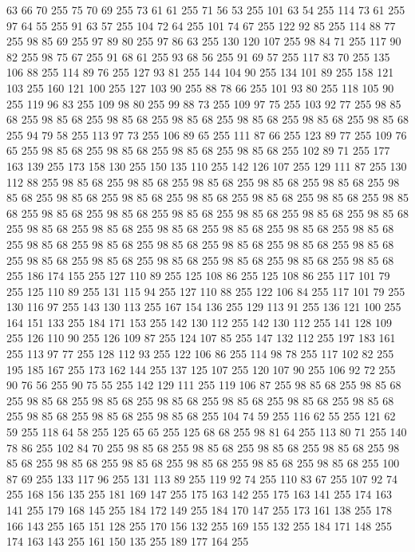 63 66 70 255 75 70 69 255 73 61 61 255 71 56 53 255 101 63 54 255 114 73 61 255 97 64 55 255 91 63 57 255 104 72 64 255 101 74 67 255 122 92 85 255 114 88 77 255 98 85 69 255 97 89 80 255 97 86 63 255 130 120 107 255 98 84 71 255 117 90 82 255 98 75 67 255 91 68 61 255 93 68 56 255 91 69 57 255 117 83 70 255 135 106 88 255 114 89 76 255 127 93 81 255 144 104 90 255 134 101 89 255 158 121 103 255 160 121 100 255 127 103 90 255 88 78 66 255 101 93 80 255 118 105 90 255 119 96 83 255 109 98 80 255 99 88 73 255 109 97 75 255 103 92 77 255 98 85 68 255 98 85 68 255 98 85 68 255 98 85 68 255 98 85 68 255 98 85 68 255 98 85 68 255 94 79 58 255 113 97 73 255 106 89 65 255 111 87 66 255 123 89 77 255 109 76 65 255 98 85 68 255 98 85 68 255 98 85 68 255 98 85 68 255 102 89 71 255 177 163 139 255 173 158 130 255 150 135 110 255 142 126 107 255 129 111 87 255 130 112 88 255 98 85 68 255
98 85 68 255 98 85 68 255 98 85 68 255 98 85 68 255 98 85 68 255 98 85 68 255 98 85 68 255 98 85 68 255 98 85 68 255 98 85 68 255 98 85 68 255 98 85 68 255 98 85 68 255 98 85 68 255 98 85 68 255 98 85 68 255 98 85 68 255 98 85 68 255 98 85 68 255 98 85 68 255 98 85 68 255 98 85 68 255 98 85 68 255 98 85 68 255 98 85 68 255 98 85 68 255 98 85 68 255 98 85 68 255 98 85 68 255 98 85 68 255 98 85 68 255 98 85 68 255 98 85 68 255 98 85 68 255 98 85 68 255 186 174 155 255 127 110 89 255 125 108 86 255 125 108 86 255 117 101 79 255 125 110 89 255 131 115 94 255 127 110 88 255 122 106 84 255 117 101 79 255 130 116 97 255 143 130 113 255 167 154 136 255 129 113 91 255 136 121 100 255 164 151 133 255 184 171 153 255 142 130 112 255 142 130 112 255 141 128 109 255 126 110 90 255 126 109 87 255 124 107 85 255 147 132 112 255 197 183 161 255 113 97 77 255 128 112 93 255 122 106 86 255 114 98 78 255
117 102 82 255 195 185 167 255 173 162 144 255 137 125 107 255 120 107 90 255 106 92 72 255 90 76 56 255 90 75 55 255 142 129 111 255 119 106 87 255 98 85 68 255 98 85 68 255 98 85 68 255 98 85 68 255 98 85 68 255 98 85 68 255 98 85 68 255 98 85 68 255 98 85 68 255 98 85 68 255 98 85 68 255 104 74 59 255 116 62 55 255 121 62 59 255 118 64 58 255 125 65 65 255 125 68 68 255 98 81 64 255 113 80 71 255 140 78 86 255 102 84 70 255 98 85 68 255 98 85 68 255 98 85 68 255 98 85 68 255 98 85 68 255 98 85 68 255 98 85 68 255 98 85 68 255 98 85 68 255 98 85 68 255 100 87 69 255 133 117 96 255 131 113 89 255 119 92 74 255 110 83 67 255 107 92 74 255 168 156 135 255 181 169 147 255 175 163 142 255 175 163 141 255 174 163 141 255 179 168 145 255 184 172 149 255 184 170 147 255 173 161 138 255 178 166 143 255 165 151 128 255 170 156 132 255 169 155 132 255 184 171 148 255 174 163 143 255 161 150 135 255 189 177 164 255
